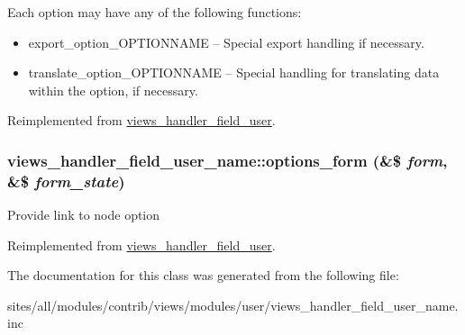  Each option may have any of the following functions:\begin{itemize}
\item export\_\-option\_\-OPTIONNAME -- Special export handling if necessary.\item translate\_\-option\_\-OPTIONNAME -- Special handling for translating data within the option, if necessary. \end{itemize}


Reimplemented from \hyperlink{classviews__handler__field__user_545d229a041bf920b95ac59d89b1e4b2}{views\_\-handler\_\-field\_\-user}.\hypertarget{classviews__handler__field__user__name_0c3b7db3d060e384287fa62f348c9387}{
\subsubsection[{options\_\-form}]{\setlength{\rightskip}{0pt plus 5cm}views\_\-handler\_\-field\_\-user\_\-name::options\_\-form (\&\$ {\em form}, \/  \&\$ {\em form\_\-state})}}
\label{classviews__handler__field__user__name_0c3b7db3d060e384287fa62f348c9387}


Provide link to node option 

Reimplemented from \hyperlink{classviews__handler__field__user_ecf77682fa7dc9daf1fa97cbe045420d}{views\_\-handler\_\-field\_\-user}.

The documentation for this class was generated from the following file:\begin{CompactItemize}
\item 
sites/all/modules/contrib/views/modules/user/views\_\-handler\_\-field\_\-user\_\-name.inc\end{CompactItemize}
